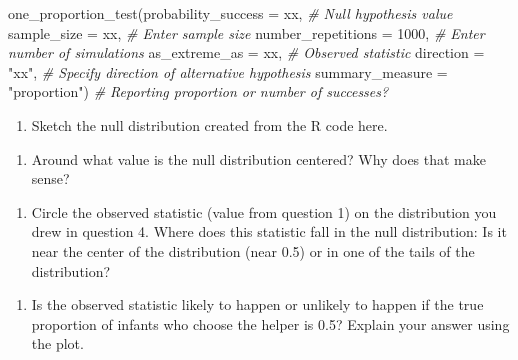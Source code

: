 \documentclass[
]{report}
\newenvironment{Shaded}{\begin{snugshade}}{\end{snugshade}}
\newcommand{\AttributeTok}[1]{\textcolor[rgb]{0.77,0.63,0.00}{#1}}
\newcommand{\CommentTok}[1]{\textcolor[rgb]{0.56,0.35,0.01}{\textit{#1}}}
\newcommand{\DecValTok}[1]{\textcolor[rgb]{0.00,0.00,0.81}{#1}}
\newcommand{\FunctionTok}[1]{\textcolor[rgb]{0.00,0.00,0.00}{#1}}
\newcommand{\NormalTok}[1]{#1}
\newcommand{\StringTok}[1]{\textcolor[rgb]{0.31,0.60,0.02}{#1}}
\providecommand{\tightlist}{%
  \setlength{\itemsep}{0pt}\setlength{\parskip}{0pt}}
\begin{document}
\begin{Shaded}
\begin{Highlighting}[]
\FunctionTok{one\_proportion\_test}\NormalTok{(}\AttributeTok{probability\_success =}\NormalTok{ xx, }\CommentTok{\# Null hypothesis value}
          \AttributeTok{sample\_size =}\NormalTok{ xx, }\CommentTok{\# Enter sample size}
          \AttributeTok{number\_repetitions =} \DecValTok{1000}\NormalTok{, }\CommentTok{\# Enter number of simulations}
          \AttributeTok{as\_extreme\_as =}\NormalTok{ xx, }\CommentTok{\# Observed statistic}
          \AttributeTok{direction =} \StringTok{"xx"}\NormalTok{, }\CommentTok{\# Specify direction of alternative hypothesis}
          \AttributeTok{summary\_measure =} \StringTok{"proportion"}\NormalTok{) }\CommentTok{\# Reporting proportion or number of successes?}
\end{Highlighting}
\end{Shaded}

\begin{enumerate}
\def\labelenumi{\arabic{enumi}.}
\setcounter{enumi}{3}
\tightlist
\item
  Sketch the null distribution created from the R code here.
\end{enumerate}

\vspace{1.8in}

\begin{enumerate}
\def\labelenumi{\arabic{enumi}.}
\setcounter{enumi}{4}
\tightlist
\item
  Around what value is the null distribution centered? Why does that make sense?
\end{enumerate}

\vspace{1in}

\begin{enumerate}
\def\labelenumi{\arabic{enumi}.}
\setcounter{enumi}{5}
\tightlist
\item
  Circle the observed statistic (value from question 1) on the distribution you drew in question 4. Where does this statistic fall in the null distribution: Is it near the center of the distribution (near 0.5) or in one of the tails of the distribution?
\end{enumerate}

\vspace{1in}

\begin{enumerate}
\def\labelenumi{\arabic{enumi}.}
\setcounter{enumi}{6}
\tightlist
\item
  Is the observed statistic likely to happen or unlikely to happen if the true proportion of infants who choose the helper is 0.5? Explain your answer using the plot.
\end{enumerate}
\end{document}
